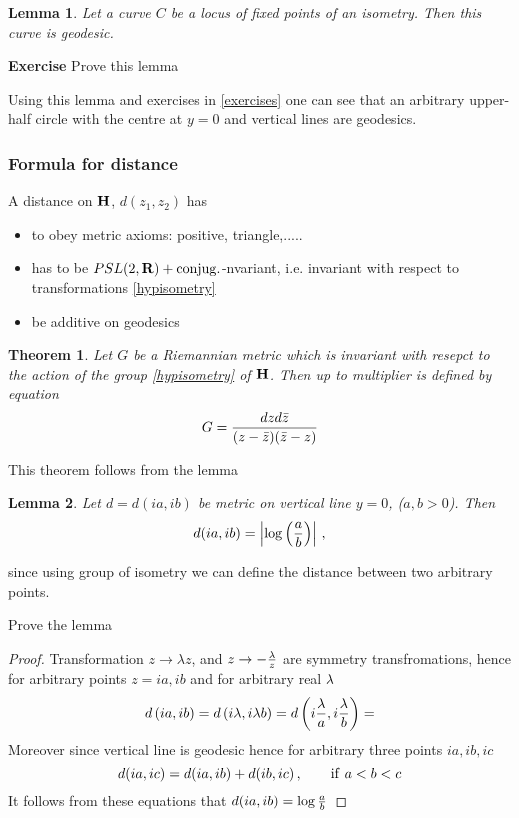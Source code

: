 \documentclass[12pt]{article}
\newtheorem{theorem}{Theorem}
\newtheorem{lemma}{Lemma}
\theoremstyle{definition}
\numberwithin{equation}{section}
\begin{document}
  \begin{lemma}
Let a curve $C$ be a locus of fixed points of an isometry.
Then this curve is geodesic.
\end{lemma}

\m

{\bf Exercise} Prove this lemma

\m

Using this lemma and exercises in \ref{exercises} 
one can see that
an arbitrary upper-half circle with the centre
at $y=0$ and
vertical lines are geodesics.

\subsubsection
  {Formula for distance}



A distance on ${\bf H}$,
$d(z_1,z_2)$  has 

\begin{itemize}

\item
  to obey metric axioms: positive, triangle,.....

\item
 has to be  $PSL(2,{\bf R})+{\rm conjug.}$-nvariant,
i.e. invariant  with respect to transformations
\eqref{hypisometry}


\item
be additive on geodesics


\end{itemize}

\begin{theorem}
Let $G$ be a Riemannian metric which is 
invariant with resepct to the
action of the group \eqref{hypisometry} of $\bf H$.
 Then  up to multiplier is defined
by equation
         $$
G={dz d\bar z\over (z-\bar z)(\bar z-z)}
       $$

\end{theorem}

This theorem follows from the lemma 

  \begin{lemma}
Let $d=d(ia,ib)$ be metric on vertical line $y=0$,
($a,b>0$).
  Then
         \begin{equation*}
      d(ia,ib)=\left|\log\left(a\over b\right)\right|\,,
       \end{equation*}
\end{lemma}
since using group of isometry we can define the distance
between two arbitrary points.

Prove the lemma

\begin{proof}Transformation $z\to\lambda z$, and 
$z\to -{\lambda\over z}$ are symmetry transfromations,
hence for arbitrary points $z=ia,ib$
and for arbitrary real $\lambda$
   $$
d\left(ia,ib\right)=
d\left(i\lambda,i\lambda b\right)=
d\left(i{\lambda\over a},i{\lambda\over b}\right)=
   $$
Moreover since vertical line is geodesic hence
for arbitrary three points $ia,ib,ic$
      $$
   d(ia,ic)=d(ia,ib)+d(ib,ic)\,,\qquad
{\rm if}\,\, a<b<c
      $$
It follows from these equations that 
$d(ia,ib)=\log {a\over b}$



\end{proof}
\end{document}
